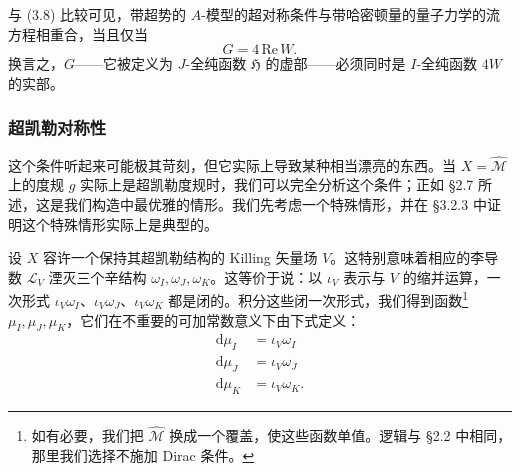 \documentclass[11pt,a4paper,UTF8]{ctexart}
\theoremstyle{plain}
\theoremstyle{definition}
\begin{document}

与 (3.8) 比较可见，带超势的 $A$-模型的超对称条件与带哈密顿量的量子力学的流方程相重合，当且仅当
\begin{equation}
    G=4\,\mathrm{Re}\,W.
    \tag{3.14}
\end{equation}
换言之，$G$——它被定义为 $J$-全纯函数 $\mathfrak{H}$ 的虚部——必须同时是 $I$-全纯函数 $4W$ 的实部。


\subsubsection{超凯勒对称性}

这个条件听起来可能极其苛刻，但它实际上导致某种相当漂亮的东西。当 $X=\widehat{\mathcal{M}}$ 上的度规 $g$ 实际上是超凯勒度规时，我们可以完全分析这个条件；正如 §2.7 所述，这是我们构造中最优雅的情形。我们先考虑一个特殊情形，并在 §3.2.3 中证明这个特殊情形实际上是典型的。

设 $X$ 容许一个保持其超凯勒结构的 Killing 矢量场 $V$。这特别意味着相应的李导数 $\mathcal{L}_V$ 湮灭三个辛结构 $\omega_I,\omega_J,\omega_K$。这等价于说：以 $\iota_V$ 表示与 $V$ 的缩并运算，一次形式 $\iota_V\omega_I$、$\iota_V\omega_J$、$\iota_V\omega_K$ 都是闭的。积分这些闭一次形式，我们得到函数\footnote{如有必要，我们把 $\widehat{\mathcal{M}}$ 换成一个覆盖，使这些函数单值。逻辑与 §2.2 中相同，那里我们选择不施加 Dirac 条件。}$\mu_I,\mu_J,\mu_K$，它们在不重要的可加常数意义下由下式定义：
\begin{equation}
    \begin{aligned}
        \mathrm{d}\mu_I &= \iota_V\omega_I\\
        \mathrm{d}\mu_J &= \iota_V\omega_J\\
        \mathrm{d}\mu_K &= \iota_V\omega_K.
    \end{aligned}
    \tag{3.15}
\end{equation}
\end{document}
